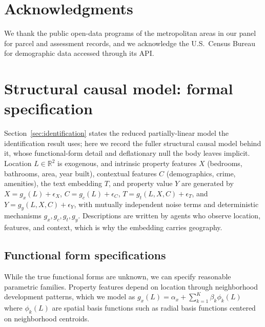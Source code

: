\documentclass{article}
\begin{document}











\section*{Acknowledgments}

We thank the public open-data programs of the metropolitan areas in our panel for
parcel and assessment records, and we acknowledge the U.S.\ Census Bureau for
demographic data accessed through its API.

\newpage



\newpage
\appendix

\section{Structural causal model: formal specification}
\label{app:scm}

Section~\ref{sec:identification} states the reduced partially-linear model the identification result uses; here we record the fuller structural causal model behind it, whose functional-form detail and deflationary null the body leaves implicit. Location $L \in \mathbb{R}^2$ is exogenous, and intrinsic property features $X$ (bedrooms, bathrooms, area, year built), contextual features $C$ (demographics, crime, amenities), the text embedding $T$, and property value $Y$ are generated by $X = g_x(L) + \epsilon_X$, $C = g_c(L) + \epsilon_C$, $T = g_t(L, X, C) + \epsilon_T$, and $Y = g_y(L, X, C) + \epsilon_Y$, with mutually independent noise terms and deterministic mechanisms $g_x, g_c, g_t, g_y$. Descriptions are written by agents who observe location, features, and context, which is why the embedding carries geography.

\subsection{Functional form specifications}

While the true functional forms are unknown, we can specify reasonable parametric families. Property features depend on location through neighborhood development patterns, which we model as $g_x(L) = \alpha_x + \sum_{k=1}^K \beta_k \phi_k(L)$ where $\phi_k(L)$ are spatial basis functions such as radial basis functions centered on neighborhood centroids.
\end{document}
